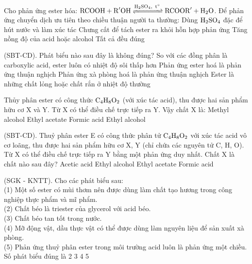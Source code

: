 \documentclass[12pt,a4paper]{article}
\begin{document}
\begin{ex}
Cho phản ứng ester hóa: $\ce{RCOOH + R^{\prime}OH <=>[\ce{H2SO4},\, t^\circ] RCOOR^{\prime} + H2O}$. Để phản ứng chuyển dịch ưu tiên theo chiều thuận người ta thường:
\choice
{Dùng $\ce{H2SO4}$ đặc để hút nước và làm xúc tác}
{Chưng cất để tách ester ra khỏi hỗn hợp phản ứng}
{Tăng nồng độ của acid hoặc alcohol}
{Tất cả đều đúng}
\loigiai{}
\end{ex}

\begin{ex}
(SBT-CD). Phát biểu nào sau đây là không đúng?
\choice
{So với các đồng phân là carboxylic acid, ester luôn có nhiệt độ sôi thấp hơn}
{Phản ứng ester hoá là phản ứng thuận nghịch}
{Phản ứng xà phòng hoá là phản ứng thuận nghịch}
{Ester là những chất lỏng hoặc chất rắn ở nhiệt độ thường}
\loigiai{}
\end{ex}

\begin{ex}
Thủy phân ester có công thức $\ce{C4H8O2}$ (với xúc tác acid), thu được hai sản phẩm hữu cơ X và Y. Từ X có thể điều chế trực tiếp ra Y. Vậy chất X là:
\choice
{Methyl alcohol}
{Ethyl acetate}
{Formic acid}
{Ethyl alcohol}
\loigiai{}
\end{ex}

\begin{ex}
(SBT-CD). Thuỷ phân ester E có công thức phân tử $\ce{C4H8O2}$ với xúc tác acid vô cơ loãng, thu được hai sản phẩm hữu cơ X, Y (chỉ chứa các nguyên tử C, H, O). Từ X có thể điều chế trực tiếp ra Y bằng một phản ứng duy nhất. Chất X là chất nào sau đây?
\choice
{Acetic acid}
{Ethyl alcohol}
{Ethyl acetate}
{Formic acid}
\loigiai{}
\end{ex}

\begin{ex}
(SGK - KNTT). Cho các phát biểu sau:\\
(1) Một số ester có mùi thơm nên được dùng làm chất tạo hương trong công nghiệp thực phẩm và mĩ phẩm.\\
(2) Chất béo là triester của glycerol với acid béo.\\
(3) Chất béo tan tốt trong nước.\\
(4) Mỡ động vật, dầu thực vật có thể được dùng làm nguyên liệu để sản xuất xà phòng.\\
(5) Phản ứng thuỷ phân ester trong môi trường acid luôn là phản ứng một chiều.\\
Số phát biểu đúng là
\choice
{2}
{3}
{4}
{5}
\loigiai{}
\end{ex}
\end{document}
